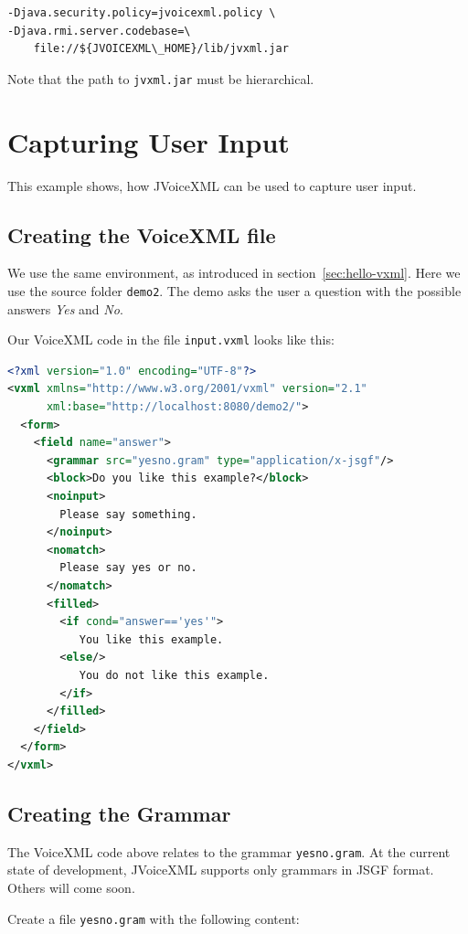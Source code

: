 \documentclass[11pt,a4paper]{article}
\begin{document}
\begin{lstlisting}
-Djava.security.policy=jvoicexml.policy \
-Djava.rmi.server.codebase=\
    file://${JVOICEXML\_HOME}/lib/jvxml.jar
\end{lstlisting}

Note that the path to \texttt{jvxml.jar} must be hierarchical.

\section{Capturing User Input}

This example shows, how JVoiceXML can be used to capture user input. 

\subsection{Creating the VoiceXML file}

We use the same environment, as introduced in section~\ref{sec:hello-vxml}. Here
we use the source folder \texttt{demo2}.
The demo asks the user a question with the possible answers
\emph{Yes} and \emph{No}.

Our VoiceXML code in the file \texttt{input.vxml} looks like this:

\begin{lstlisting}[language=XML]
<?xml version="1.0" encoding="UTF-8"?> 
<vxml xmlns="http://www.w3.org/2001/vxml" version="2.1"
      xml:base="http://localhost:8080/demo2/">
  <form>
    <field name="answer">
      <grammar src="yesno.gram" type="application/x-jsgf"/>
      <block>Do you like this example?</block>
      <noinput>
        Please say something.
      </noinput>
      <nomatch>
        Please say yes or no.
      </nomatch>
      <filled>
        <if cond="answer=='yes'">
           You like this example.
        <else/>
           You do not like this example.
        </if>
      </filled>
    </field>
  </form>
</vxml>
\end{lstlisting}

\subsection{Creating the Grammar}

The VoiceXML code above relates to the grammar \texttt{yesno.gram}. At the
current state of development, JVoiceXML supports only grammars in JSGF format.
Others will come soon.

Create a file \texttt{yesno.gram} with the following content:
\end{document}
